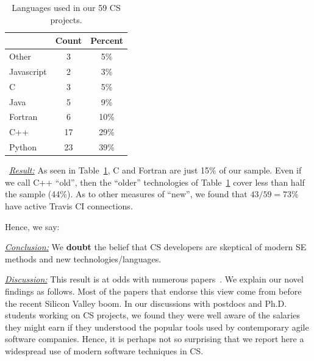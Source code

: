 \documentclass[sigconf,review,anonymous]{acmart}
\newenvironment{RQ}{\vspace{1mm}\begin{tcolorbox}[enhanced,width=3.4in,size=fbox,colback=red!5!white,drop shadow southeast,sharp corners]}{\end{tcolorbox}}
\begin{document}
\begin{table}

\caption{Languages used in our 59 CS projects.  
}\label{tbl:language}
 \footnotesize
 \hspace{-3pt}\begin{tabular}{l|c|c}
 \multicolumn{1}{c|}{} & \multicolumn{1}{c|}{Count} & \multicolumn{1}{c}{Percent}\\
\hline
Other & 3 &  5\%  \\ 
Javascript	& 2 & 3\% \\ 
C &	3 & 5\% \\ 
Java	& 5 & 9\% \\ 
Fortran	& 6 & 10\% \\
C++	& 17 & 29\% \\
Python & 23 & 39\% 
\end{tabular}
\end{table}
\noindent~\textit{\underline{Result:}} 
As seen in Table~\ref{tbl:language}, C and Fortran are just 15\% of our sample.
Even if we call C++ ``old'', then the ``older'' technologies of Table~\ref{tbl:language}
cover less than half the sample (44\%).
 As to other measures of ``new'', we found that  $43/59=73\%$
have active
Travis CI connections.  

 

Hence, we say:

\begin{RQ} 
\textit{\underline{Conclusion:}} We \textbf{doubt} the belief that 
CS developers are skeptical of modern SE methods and new technologies/languages.
\end{RQ}

\noindent \textit{\underline{Discussion:}} This result is at odds
with numerous papers~\cite{basili08_hpc, carver07_environment, Prabhu11_cssurvey, kendall05_C, ragan14_pythoncs}. We explain our novel findings as follows. 
Most of the papers that endorse this view come from before the recent Silicon Valley boom. In our discussions with postdocs and Ph.D. students working on CS projects,
we found they were well aware of the salaries they might earn if they understood the popular tools used by contemporary agile software companies. 
Hence, it is perhaps not so surprising that we report here a widespread use of modern software techniques in CS.
 
\end{document}
